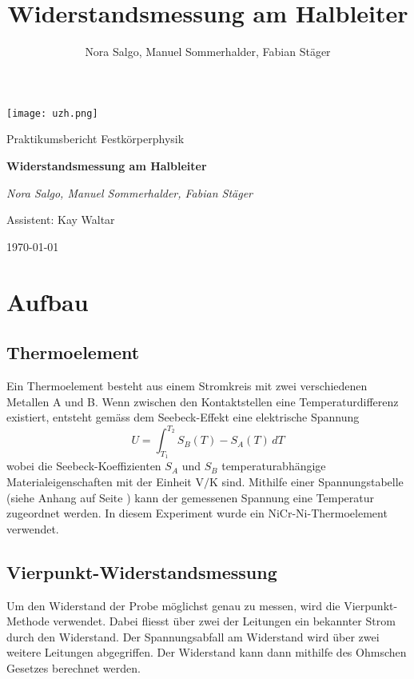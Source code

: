 \documentclass[a4paper]{scrartcl}
\title{Widerstandsmessung am Halbleiter}
\author{Nora Salgo, Manuel Sommerhalder, Fabian Stäger}
\begin{document}
\begin{titlepage}
	\centering
	\texttt{[image: uzh.png]}\par\vspace{1cm}
	\vspace{1cm}
	{\Large Praktikumsbericht Festkörperphysik\par}
	\vspace{1.5cm}
	{\huge\bfseries Widerstandsmessung am Halbleiter\par}
	\vspace{2cm}
	{\Large\itshape Nora Salgo, Manuel Sommerhalder, Fabian Stäger \par\vspace{1cm}
	Assistent: Kay Waltar}
	\vfill
	

	\vfill

	{\large \today\par}
\end{titlepage}

\section{Aufbau}

\subsection{Thermoelement}
Ein Thermoelement besteht aus einem Stromkreis mit zwei verschiedenen Metallen A und B. Wenn zwischen den Kontaktstellen eine Temperaturdifferenz existiert, entsteht gemäss dem Seebeck-Effekt eine elektrische Spannung 
$$ U = \int_{T_{1}}^{T_{2}} S_{B}(T) - S_{A}(T) \, dT $$
wobei die Seebeck-Koeffizienten $S_{A}$ und $S_{B}$ temperaturabhängige Materialeigenschaften mit der Einheit V$/$K sind. Mithilfe einer Spannungstabelle (siehe Anhang auf Seite \pageref{Kacktabelle}) kann der gemessenen Spannung eine Temperatur zugeordnet werden. In diesem Experiment wurde ein NiCr-Ni-Thermoelement verwendet.

\subsection{Vierpunkt-Widerstandsmessung}
Um den Widerstand der Probe möglichst genau zu messen, wird die Vierpunkt-Methode verwendet. Dabei fliesst über zwei der Leitungen ein bekannter Strom durch den Widerstand. Der Spannungsabfall am Widerstand wird über zwei weitere Leitungen abgegriffen. Der Widerstand kann dann mithilfe des Ohmschen Gesetzes berechnet werden.
\end{document}
